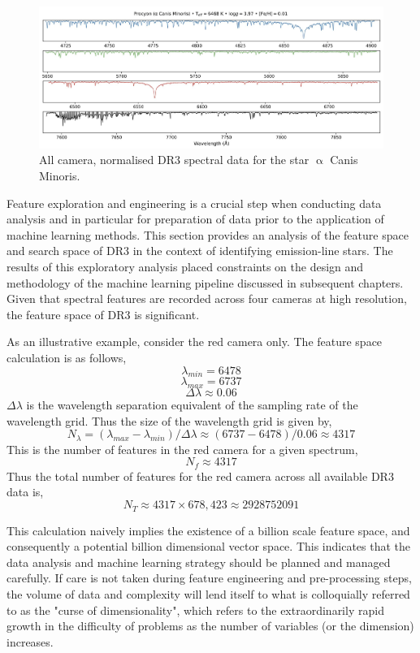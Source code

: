 \begin{figure}[!htb]
\centering
\includegraphics[scale=.25]{figures/galah cameras.jpeg}
\caption{All camera, normalised DR3 spectral data for the star $\upalpha$ Canis Minoris.}
\end{figure}

Feature exploration and engineering is a crucial step when conducting data analysis and in particular for preparation of data prior to the application of machine learning methods. This section provides an analysis of the feature space and search space of DR3 in the context of identifying emission-line stars. The results of this exploratory analysis placed constraints on the design and methodology of the machine learning pipeline discussed in subsequent chapters. Given that spectral features are recorded across four cameras at high resolution, the feature space of DR3 is significant. 

As an illustrative example, consider the red camera only. The feature space calculation is as follows,
\[\lambda_{min} = 6478\]
\[\lambda_{max} = 6737\]
\[\Delta\lambda \approx 0.06\]
$\Delta\lambda$ is the wavelength separation equivalent of the sampling rate of the wavelength grid. Thus the size of the wavelength grid is given by, \[N_{\lambda} = (\lambda_{max}-\lambda_{min})/\Delta\lambda \approx (6737-6478)/0.06 \approx 4317\]
This is the number of features in the red camera for a given spectrum, \[N_{f} \approx 4317\]
Thus the total number of features for the red camera across all available DR3 data is, \[N_{T} \approx 4317\times678,423 \approx \num[round-precision=2,round-mode=figures,
     scientific-notation=true]{2928752091}\]

This calculation naively implies the existence of a billion scale feature space, and consequently a potential billion dimensional vector space. This indicates that the data analysis and machine learning strategy should be planned and managed carefully. If care is not taken during feature engineering and pre-processing steps, the volume of data and complexity will lend itself to what is colloquially referred to as the "curse of dimensionality", which refers to the extraordinarily rapid growth in the difficulty of problems as the number of variables (or the dimension) increases\cite{kuo2005lifting}.

